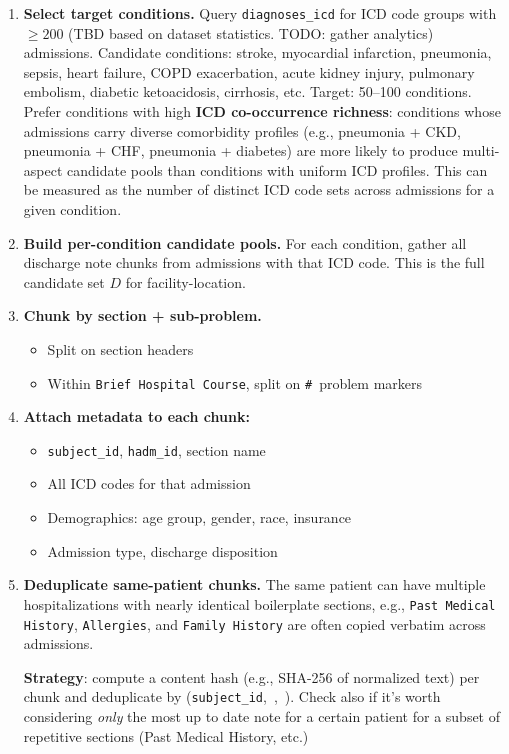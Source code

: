 \documentclass[11pt,a4paper]{article}
\newcommand{\field}[1]{\nolinkurl{#1}}
\begin{document}
\begin{enumerate}[leftmargin=*, itemsep=2mm]
	\item \textbf{Select target conditions.}  Query \field{diagnoses\_icd}
	      for ICD code groups with $\geq 200$ (TBD based on dataset statistics. TODO: gather analytics) admissions.\newline
	      Candidate conditions: stroke, myocardial infarction, pneumonia, sepsis, heart failure, COPD exacerbation, acute kidney injury, pulmonary embolism, diabetic ketoacidosis, cirrhosis, etc.  Target: 50--100 conditions.\newline
	      Prefer conditions with high \textbf{ICD co-occurrence richness}: conditions whose admissions carry diverse comorbidity profiles (e.g., pneumonia + CKD, pneumonia + CHF, pneumonia + diabetes) are more likely to produce multi-aspect candidate pools than conditions with uniform ICD profiles. This can be measured as the number of distinct ICD code sets across admissions for a given condition.

	\item \textbf{Build per-condition candidate pools.}  For each condition, gather all discharge note chunks from admissions with that ICD code. This is the full candidate set $D$ for facility-location.

	\item \textbf{Chunk by section + sub-problem.}
	      \begin{itemize}[itemsep=2pt, parsep=1pt]
		      \item Split on section headers
		      \item Within \texttt{Brief Hospital Course}, split on \texttt{\#}~problem markers
	      \end{itemize}

	\item \textbf{Attach metadata to each chunk:}
	      \begin{itemize}[itemsep=2pt, parsep=1pt]
		      \item \field{subject\_id}, \field{hadm\_id}, section name
		      \item All ICD codes for that admission
		      \item Demographics: age group, gender, race, insurance
		      \item Admission type, discharge disposition
	      \end{itemize}

	\item \textbf{Deduplicate same-patient chunks.}
	      The same patient can have multiple hospitalizations with nearly identical boilerplate sections, e.g., \texttt{Past Medical History}, \texttt{Allergies}, and \texttt{Family History} are often copied verbatim across admissions.

	      \textbf{Strategy}: compute a content hash (e.g., SHA-256 of normalized text) per chunk and deduplicate by (\field{subject\_id},\, ,\, ). Check also if it's worth considering \emph{only} the most up to date note for a certain patient for a subset of repetitive sections (Past Medical History, etc.)
\end{enumerate}
\end{document}
